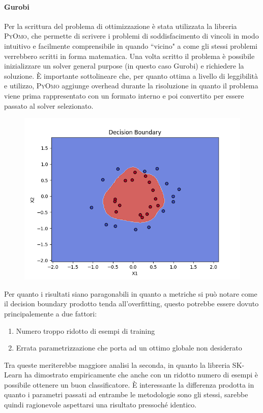 \documentclass[12pt]{article}
\begin{document}
\paragraph{Gurobi} Per la scrittura del problema di ottimizzazione è stata utilizzata la libreria \textsc{PyOmo},
che permette di scrivere i problemi di soddisfacimento di vincoli in modo intuitivo e facilmente comprensibile in quando “vicino" a come gli stessi problemi verrebbero scritti in forma matematica.
Una volta scritto il problema è possibile inizializzare un solver general purpose (in questo caso Gurobi) e richiedere la soluzione.
È importante sottolineare che, per quanto ottima a livello di leggibilità e utilizzo, 
\textsc{PyOmo} aggiunge overhead durante la risoluzione in quanto il problema viene prima rappresentato con un formato interno e poi convertito per essere passato al solver selezionato.

\begin{figure}[H]
  \centering
  \includegraphics[width=\linewidth]{img/decision_boundary_gurobi.png}
\end{figure}

Per quanto i risultati siano paragonabili in quanto a metriche si può notare come il decision boundary prodotto tenda all'overfitting,
questo potrebbe essere dovuto principalemente a due fattori:
\begin{enumerate}
  \item Numero troppo ridotto di esempi di training
  \item Errata parametrizzazione che porta ad un ottimo globale non desiderato
\end{enumerate}
Tra queste meriterebbe maggiore analisi la seconda, in quanto la libreria SK-Learn ha dimostrato empiricamente che anche con un ridotto numero di esempi è possibile ottenere un buon classificatore.
È interessante la differenza prodotta in quanto i parametri passati ad entrambe le metodologie sono gli stessi, sarebbe quindi ragionevole aspettarsi una risultato pressoché identico.
\end{document}
